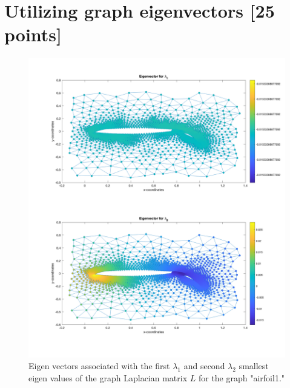 \section{Utilizing graph eigenvectors [25 points]}

\begin{figure}[H]
	\centering
	\includegraphics[width=\textwidth]{./media/eigenvector.png}
	\caption{Eigen vectors associated with the first $\lambda_1$ and second $\lambda_2$ smallest eigen values of the graph Laplacian matrix $L$ for the graph "airfoil1."}
	\label{fig:eig}
\end{figure}

